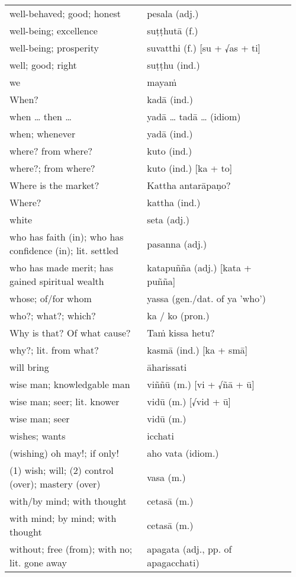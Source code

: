 \documentclass[a5paper]{memoir}
\begin{document}
\begin{longtable}{L{0.48\linewidth} L{0.48\linewidth} H}
well-behaved; good; honest & pesala (adj.) & \\[0pt]
well-being; excellence & suṭṭhutā (f.) & \\[0pt]
well-being; prosperity & suvatthi (f.) [su + √as + ti] & \\[0pt]
well; good; right & suṭṭhu (ind.) & \\[0pt]
we & mayaṁ & \\[0pt]
When? & kadā (ind.) & \\[0pt]
when \ldots{} then \ldots{} & yadā \ldots{} tadā \ldots{} (idiom) & \\[0pt]
when; whenever & yadā (ind.) & \\[0pt]
where? from where? & kuto (ind.) & \\[0pt]
where?; from where? & kuto (ind.) [ka + to] & \\[0pt]
Where is the market? & Kattha antarāpaṇo? & \\[0pt]
Where? & kattha (ind.) & \\[0pt]
white & seta (adj.) & \\[0pt]
who has faith (in); who has confidence (in); lit. settled & pasanna (adj.) & \\[0pt]
who has made merit; has gained spiritual wealth & katapuñña (adj.) [kata + puñña] & \\[0pt]
whose; of/for whom & yassa (gen./dat. of ya 'who') & \\[0pt]
who?; what?; which? & ka / ko (pron.) & \\[0pt]
Why is that? Of what cause? & Taṁ kissa hetu? & \\[0pt]
why?; lit. from what? & kasmā (ind.) [ka + smā] & \\[0pt]
will bring & āharissati & \\[0pt]
wise man; knowledgable man & viññū (m.) [vi + √ñā + ū] & \\[0pt]
wise man; seer; lit. knower & vidū (m.) [√vid + ū] & \\[0pt]
wise man; seer & vidū (m.) & \\[0pt]
wishes; wants & icchati & \\[0pt]
(wishing) oh may!; if only! & aho vata (idiom.) & \\[0pt]
(1) wish; will; (2) control (over); mastery (over) & vasa (m.) & \\[0pt]
with/by mind; with thought & cetasā (m.) & \\[0pt]
with mind; by mind; with thought & cetasā (m.) & \\[0pt]
without; free (from); with no; lit. gone away & apagata (adj., pp. of apagacchati) & \\[0pt]

\end{longtable}
\end{document}
